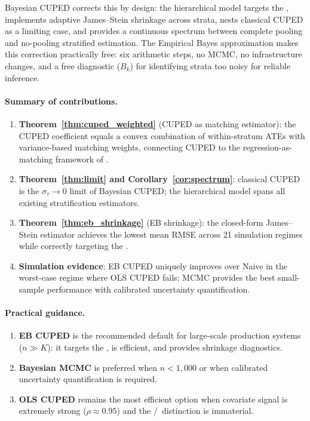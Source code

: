 \documentclass[12pt]{article}
\theoremstyle{plain}
\theoremstyle{definition}
\newcommand{\PATE}{\text{PATE}}
\newcommand{\VWATT}{\text{VWATT}}
\begin{document}
Bayesian CUPED corrects this by design: the hierarchical model targets the
\PATE, implements adaptive James--Stein shrinkage across strata, nests
classical CUPED as a limiting case, and provides a continuous spectrum between
complete pooling and no-pooling stratified estimation.
The Empirical Bayes approximation makes this correction practically free:
six arithmetic steps, no MCMC, no infrastructure changes, and a free
diagnostic ($B_k$) for identifying strata too noisy for reliable inference.

\paragraph{Summary of contributions.}
\begin{enumerate}[nosep]
  \item \textbf{Theorem~\ref{thm:cuped_weighted}} (CUPED as matching
        estimator): the CUPED coefficient equals a convex combination of
        within-stratum ATEs with variance-based matching weights, connecting
        CUPED to the regression-as-matching framework of
        \citet{angrist2009mostly}.
  \item \textbf{Theorem~\ref{thm:limit} and Corollary~\ref{cor:spectrum}}:
        classical CUPED is the $\sigma_\tau \to 0$ limit of Bayesian CUPED;
        the hierarchical model spans all existing stratification estimators.
  \item \textbf{Theorem~\ref{thm:eb_shrinkage}} (EB shrinkage):
        the closed-form James--Stein estimator achieves the lowest mean RMSE
        across 21 simulation regimes while correctly targeting the \PATE.
  \item \textbf{Simulation evidence}: EB CUPED uniquely improves over Naive
        in the worst-case regime where OLS CUPED fails; MCMC provides the
        best small-sample performance with calibrated uncertainty
        quantification.
\end{enumerate}

\paragraph{Practical guidance.}
\begin{enumerate}[label=\textbf{R\arabic*.}, nosep, leftmargin=2.5em]
  \item \textbf{EB CUPED} is the recommended default for large-scale
        production systems ($n \gg K$): it targets the \PATE, is efficient,
        and provides shrinkage diagnostics.
  \item \textbf{Bayesian MCMC} is preferred when $n < 1{,}000$ or when
        calibrated uncertainty quantification is required.
  \item \textbf{OLS CUPED} remains the most efficient option when covariate
        signal is extremely strong ($\rho \approx 0.95$) and the \VWATT/\PATE\
        distinction is immaterial.
\end{enumerate}
\end{document}
